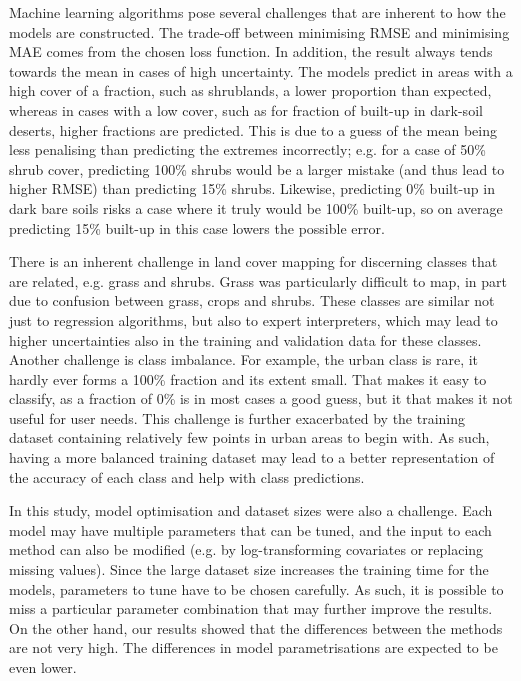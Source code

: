 \documentclass[review,authoryear,3p]{elsarticle}
\begin{document}
Machine learning algorithms pose several challenges that are inherent to how the models are constructed.
The trade-off between minimising \gls{RMSE} and minimising \gls{MAE} comes from the chosen loss function.
In addition, the result always tends towards the mean in cases of high uncertainty.
The models predict in areas with a high cover of a fraction, such as shrublands, a lower proportion than expected, whereas in cases with a low cover, such as for fraction of built-up in dark-soil deserts, higher fractions are predicted.
This is due to a guess of the mean being less penalising than predicting the extremes incorrectly; e.g. for a case of 50\% shrub cover, predicting 100\% shrubs would be a larger mistake (and thus lead to higher RMSE) than predicting 15\% shrubs.
Likewise, predicting 0\% built-up in dark bare soils risks a case where it truly would be 100\% built-up, so on average predicting 15\% built-up in this case lowers the possible error.

There is an inherent challenge in land cover mapping for discerning classes that are related, e.g. grass and shrubs.
Grass was particularly difficult to map, in part due to confusion between grass, crops and shrubs.
These classes are similar not just to regression algorithms, but also to expert interpreters, which may lead to higher uncertainties also in the training and validation data for these classes.
Another challenge is class imbalance.
For example, the urban class is rare, it hardly ever forms a 100\% fraction and its extent small.
That makes it easy to classify, as a fraction of 0\% is in most cases a good guess, but it that makes it not useful for user needs.
This challenge is further exacerbated by the training dataset containing relatively few points in urban areas to begin with.
As such, having a more balanced training dataset may lead to a better representation of the accuracy of each class and help with class predictions.

In this study, model optimisation and dataset sizes were also a challenge.
Each model may have multiple parameters that can be tuned, and the input to each method can also be modified (e.g. by log-transforming covariates or replacing missing values).
Since the large dataset size increases the training time for the models, parameters to tune have to be chosen carefully.
As such, it is possible to miss a particular parameter combination that may further improve the results.
On the other hand, our results showed that the differences between the methods are not very high.
The differences in model parametrisations are expected to be even lower.
\end{document}
